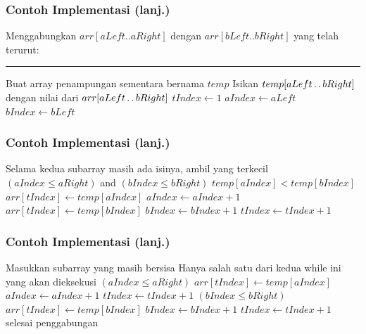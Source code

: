 \begin{frame}
\frametitle{Contoh Implementasi (lanj.)}
Menggabungkan $arr[aLeft..aRight]$ dengan $arr[bLeft..bRight]$ yang telah terurut:
\noindent\rule{10cm}{0.4pt}
\begin{codebox}
\li \Comment Buat array penampungan sementara bernama $temp$
\li \Comment Isikan $temp[aLeft \mathinner{\ldotp\ldotp} bRight]$ dengan nilai dari $arr[aLeft \mathinner{\ldotp\ldotp} bRight]$
\li $tIndex \gets 1$
\li $aIndex \gets aLeft$
\li $bIndex \gets bLeft$
\end{codebox}
\end{frame}

\begin{frame}
\frametitle{Contoh Implementasi (lanj.)}
\begin{codebox}
\setcounter{codelinenumber}{5}
\li \Comment Selama kedua subarray masih ada isinya, ambil yang terkecil
\li \While $(aIndex \leq aRight)$ and $(bIndex \leq bRight)$ \Do
\li   \If $temp[aIndex] < temp[bIndex]$ \Then
\li     $arr[tIndex] \gets temp[aIndex]$
\li     $aIndex \gets aIndex + 1$
\li   \Else
\li     $arr[tIndex] \gets temp[bIndex]$
\li     $bIndex \gets bIndex + 1$
      \End
\li   $tIndex \gets tIndex + 1$
    \End
\end{codebox}
\end{frame}

\begin{frame}
\frametitle{Contoh Implementasi (lanj.)}
\begin{codebox}
\setcounter{codelinenumber}{14}
\li \Comment Masukkan subarray yang masih bersisa
\li \Comment Hanya salah satu dari kedua while ini yang akan dieksekusi
\li \While $(aIndex \leq aRight)$ \Do
\li   $arr[tIndex] \gets temp[aIndex]$
\li   $aIndex \gets aIndex + 1$
\li   $tIndex \gets tIndex + 1$
    \End
\li \While $(bIndex \leq bRight)$ \Do
\li   $arr[tIndex] \gets temp[bIndex]$
\li   $bIndex \gets bIndex + 1$
\li   $tIndex \gets tIndex + 1$
    \End
\li \Comment selesai penggabungan
\end{codebox}
\end{frame}

